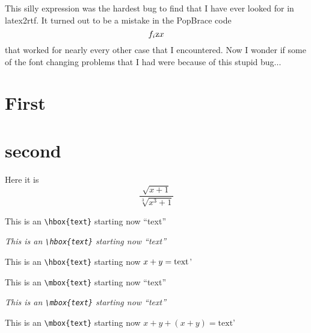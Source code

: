 \documentclass{article}
\begin{document}
This silly expression was the hardest bug to find that I have ever looked
for in latex2rtf.  It turned out to be a mistake in the PopBrace code
$$
f_i \hbox{z} x
$$
that worked for nearly every other case that I encountered.  Now I wonder
if some of the font changing problems that I had were because of this 
stupid bug...

\section{First}\section{second}Here it is
$$
\displaystyle\frac{\sqrt{x+1}} {\sqrt[3]{x^3+1}}
$$

This is an \verb#\hbox{text}# starting now ``\hbox{text}''

{\it This is an \verb#\hbox{text}# starting now ``\hbox{text}'' }

This is an \verb#\hbox{text}# starting now $x+y = \hbox{text}$'

This is an \verb#\mbox{text}# starting now ``\mbox{text}''

{\it This is an \verb#\mbox{text}# starting now ``\mbox{text}'' }

This is an \verb#\mbox{text}# starting now $x+y + (x+y) = \mbox{text}$'
\end{document}

